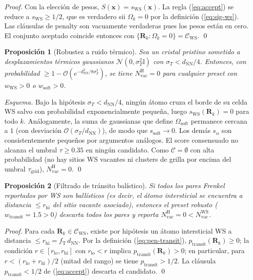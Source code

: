 \documentclass[11pt,a4paper]{article}
\newtheorem{prop}{Proposición}
\theoremstyle{remark}
\begin{document}
\begin{proof}
Con la elección de pesos, $S(\mathbf{x}) = s_\text{WS}(\mathbf{x})$.
La regla (\ref{eq:accept}) se reduce a $s_\text{WS} \geq 1/2$, que
es verdadero sii $\Omega_k = 0$ por la definición (\ref{eq:sig-ws}).
Las cláusulas de penalty son vacuamente verdaderas pues los pesos
están en cero. El conjunto aceptado coincide entonces con
$\{\mathbf{R}_k : \Omega_k = 0\} = \mathcal{C}_\text{WS}$.
\qed
\end{proof}

\begin{prop}[Robustez a ruido térmico]
\label{prop:thermal}
Sea un cristal pristino sometido a desplazamientos térmicos
gaussianos $\mathcal{N}(0, \sigma_T^2 \mathbb{I})$ con
$\sigma_T < d_\text{NN}/4$. Entonces, con probabilidad
$\geq 1 - \mathcal{O}(e^{-d_\text{NN}^2/8\sigma_T^2})$, se tiene
$N_\text{vac}^\text{H} = 0$ para cualquier preset con
$w_\text{WS} > 0$ o $w_\text{soft} > 0$.
\end{prop}

\begin{proof}[Esquema]
Bajo la hipótesis $\sigma_T < d_\text{NN}/4$, ningún átomo cruza el
borde de su celda WS salvo con probabilidad exponencialmente pequeña,
luego $s_\text{WS}(\mathbf{R}_k) = 0$ para todo $k$. Análogamente, la
suma de gaussianas que define $\Omega_\text{soft}$ permanece cercana a
$1$ (con desviación $\mathcal{O}(\sigma_T/d_\text{NN})$), de modo que
$s_\text{soft} \to 0$. Los demás $s_\alpha$ son consistentemente
pequeños por argumentos análogos. El score consensuado no alcanza el
umbral $\tau \geq 0.35$ en ningún candidato. Como
$\mathcal{C} = \emptyset$ con alta probabilidad (no hay sitios WS
vacantes ni clusters de grilla por encima del umbral
$\tau_\text{grid}$), $N_\text{vac}^\text{H} = 0$.
\qed
\end{proof}

\begin{prop}[Filtrado de tránsito balístico]
\label{prop:transit}
Si todos los pares Frenkel reportados por WS son ballísticos (es
decir, el átomo intersticial se encuentra a distancia
$\leq r_\text{hi}$ del sitio vacante asociado), entonces el preset
\emph{robusto} ($w_\text{transit} = 1.5 > 0$) descarta todos los
pares y reporta $N_\text{vac}^\text{H} = 0 < N_\text{vac}^\text{WS}$.
\end{prop}

\begin{proof}
Para cada $\mathbf{R}_k \in \mathcal{C}_\text{WS}$, existe por
hipótesis un átomo intersticial WS a distancia
$\leq r_\text{hi} = f_\text{T}\,d_\text{NN}$. Por la definición
(\ref{eq:pen-transit}), $p_\text{transit}(\mathbf{R}_k) \geq 0$;
la condición $r \in [r_\text{lo}, r_\text{hi}]$ con $r_\text{lo} < r$
implica $p_\text{transit}(\mathbf{R}_k) > 0$; en particular, para
$r < (r_\text{lo} + r_\text{hi})/2$ (mitad del rango) se tiene
$p_\text{transit} > 1/2$. La cláusula
$p_\text{transit} < 1/2$ de (\ref{eq:accept}) descarta el candidato.
\qed
\end{proof}
\end{document}
